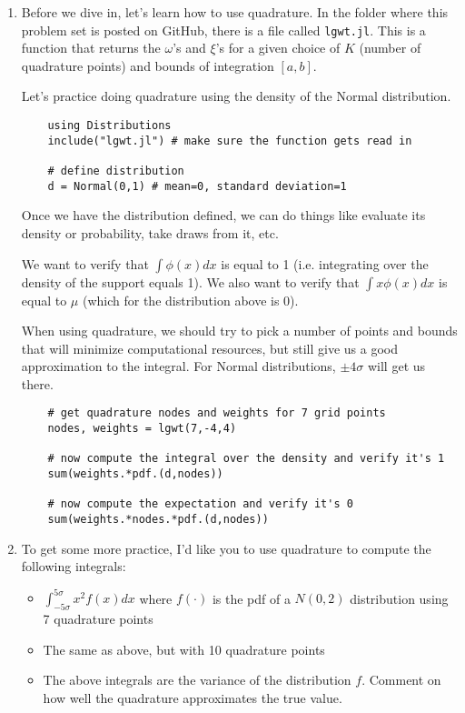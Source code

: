 \documentclass[12pt,english]{article}
\begin{document}
\begin{enumerate}
\begin{enumerate}
    \item Before we dive in, let's learn how to use quadrature. In the folder where this problem set is posted on GitHub, there is a file called \texttt{lgwt.jl}. This is a function that returns the $\omega$'s and $\xi$'s for a given choice of $K$ (number of quadrature points) and bounds of integration $[a,b]$.
    
    Let's practice doing quadrature using the density of the Normal distribution.
    
    \begin{verbatim}
    using Distributions
    include("lgwt.jl") # make sure the function gets read in
    
    # define distribution
    d = Normal(0,1) # mean=0, standard deviation=1
    \end{verbatim}

    Once we have the distribution defined, we can do things like evaluate its density or probability, take draws from it, etc.
    
    We want to verify that $\int \phi(x)dx$ is equal to 1 (i.e. integrating over the density of the support equals 1). We also want to verify that $\int x\phi(x)dx$ is equal to $\mu$ (which for the distribution above is 0).
    
    When using quadrature, we should try to pick a number of points and bounds that will minimize computational resources, but still give us a good approximation to the integral. For Normal distributions, $\pm 4\sigma$ will get us there.
    
    \begin{verbatim}
    # get quadrature nodes and weights for 7 grid points
    nodes, weights = lgwt(7,-4,4)
    
    # now compute the integral over the density and verify it's 1
    sum(weights.*pdf.(d,nodes))
    
    # now compute the expectation and verify it's 0
    sum(weights.*nodes.*pdf.(d,nodes))
    \end{verbatim}
    
    \item To get some more practice, I'd like you to use quadrature to compute the following integrals:
    
    \begin{itemize}
        \item $\int_{-5\sigma}^{5\sigma}x^{2}f\left(x\right)dx$ where $f\left(\cdot\right)$ is the pdf of a $N\left(0,2\right)$ distribution using 7 quadrature points
        \item The same as above, but with 10 quadrature points
        \item The above integrals are the variance of the distribution $f$. Comment on how well the quadrature approximates the true value.
    \end{itemize}
    

\end{enumerate}
\end{enumerate}
\end{document}
